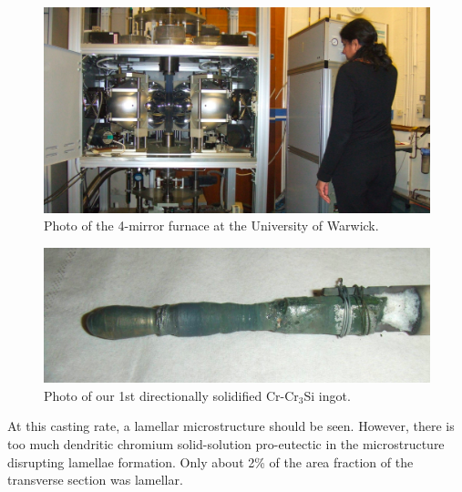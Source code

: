 \begin{figure}[H]
\begin{center}
\includegraphics{MirrorFurnace}
\caption{Photo of the 4-mirror furnace at the University of Warwick.}\label{fig:MirrorFurnace}
\end{center}
\end{figure}
%
\begin{figure}[H]
\begin{center}
\includegraphics{FirstCast}
\caption{Photo of our 1st directionally solidified Cr-Cr$_3$Si ingot.}\label{fig:FirstCast}
\end{center}
\end{figure}
%
At this casting rate, a lamellar microstructure should be seen. However, there is too much dendritic chromium solid-solution pro-eutectic in the microstructure disrupting lamellae formation. Only about 2\% of the area fraction of the transverse section was lamellar. 	 
%
